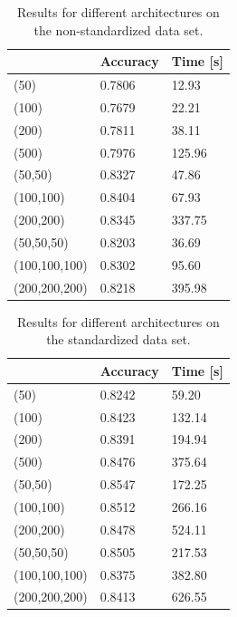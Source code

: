 \documentclass[DIV=12, ngerman, fontsize=12pt, parskip=half]{scrreprt}
\begin{document}
	\begin{table}[H]
		\begin{center}
		\begin{tabular}{|l|l|l|}
			\hline
						  & Accuracy & Time {[}s{]} \\ \hline
			(50)          & 0.7806   & 12.93        \\ \hline
			(100)         & 0.7679   & 22.21        \\ \hline
			(200)         & 0.7811   & 38.11        \\ \hline
			(500)         & 0.7976   & 125.96       \\ \hline
			(50,50)       & 0.8327   & 47.86        \\ \hline
			\cellcolor[HTML]{FFC702}
			(100,100)     & 0.8404   & 67.93        \\ \hline
			(200,200)     & 0.8345   & 337.75       \\ \hline
			(50,50,50)    & 0.8203   & 36.69        \\ \hline
			(100,100,100) & 0.8302   & 95.60        \\ \hline
			(200,200,200) & 0.8218   & 395.98       \\ \hline
		\end{tabular}
		\caption{Results for different architectures on the non-standardized data set.}
		\end{center}
	\end{table}

	\begin{table}[H]
	\begin{center}
		\begin{tabular}{|l|l|l|}
			\hline
						  & Accuracy & Time {[}s{]} \\ \hline
			(50)          & 0.8242   & 59.20        \\ \hline
			(100)         & 0.8423   & 132.14        \\ \hline
			(200)         & 0.8391   & 194.94        \\ \hline
			(500)         & 0.8476   & 375.64       \\ \hline
			\cellcolor[HTML]{34FF34}
			(50,50)       & 0.8547   & 172.25        \\ \hline 
			(100,100)     & 0.8512   & 266.16        \\ \hline
			(200,200)     & 0.8478   & 524.11       \\ \hline
			(50,50,50)    & 0.8505   & 217.53        \\ \hline
			(100,100,100) & 0.8375   & 382.80        \\ \hline
			(200,200,200) & 0.8413   & 626.55       \\ \hline
		\end{tabular}
		\caption{Results for different architectures on the standardized data set.}
	\end{center}
	\end{table}
	
\end{document}
